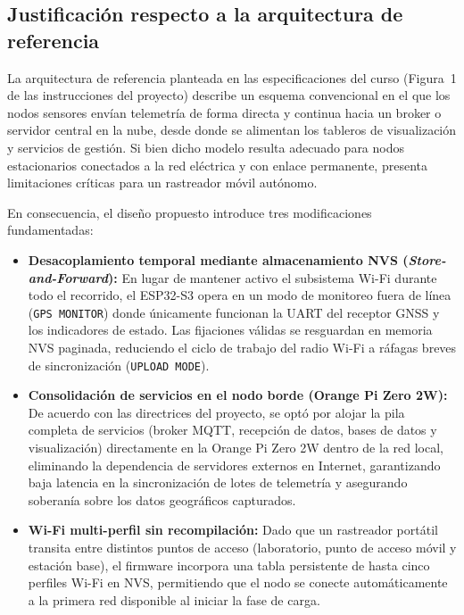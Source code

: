 \documentclass[12pt, letterpaper]{article}
\begin{document}
\subsection*{Justificación respecto a la arquitectura de referencia}

La arquitectura de referencia planteada en las especificaciones del curso (Figura~1 de las instrucciones del proyecto) describe un esquema convencional en el que los nodos sensores envían telemetría de forma directa y continua hacia un broker o servidor central en la nube, desde donde se alimentan los tableros de visualización y servicios de gestión. Si bien dicho modelo resulta adecuado para nodos estacionarios conectados a la red eléctrica y con enlace permanente, presenta limitaciones críticas para un rastreador móvil autónomo.

En consecuencia, el diseño propuesto introduce tres modificaciones fundamentadas:

\begin{itemize}
    \item \textbf{Desacoplamiento temporal mediante almacenamiento NVS (\textit{Store-and-Forward}):} En lugar de mantener activo el subsistema Wi-Fi durante todo el recorrido, el ESP32-S3 opera en un modo de monitoreo fuera de línea (\texttt{GPS MONITOR}) donde únicamente funcionan la UART del receptor GNSS y los indicadores de estado. Las fijaciones válidas se resguardan en memoria NVS paginada, reduciendo el ciclo de trabajo del radio Wi-Fi a ráfagas breves de sincronización (\texttt{UPLOAD MODE}).
    \item \textbf{Consolidación de servicios en el nodo borde (Orange Pi Zero 2W):} De acuerdo con las directrices del proyecto, se optó por alojar la pila completa de servicios (broker MQTT, recepción de datos, bases de datos y visualización) directamente en la Orange Pi Zero 2W dentro de la red local, eliminando la dependencia de servidores externos en Internet, garantizando baja latencia en la sincronización de lotes de telemetría y asegurando soberanía sobre los datos geográficos capturados.
    \item \textbf{Wi-Fi multi-perfil sin recompilación:} Dado que un rastreador portátil transita entre distintos puntos de acceso (laboratorio, punto de acceso móvil y estación base), el firmware incorpora una tabla persistente de hasta cinco perfiles Wi-Fi en NVS, permitiendo que el nodo se conecte automáticamente a la primera red disponible al iniciar la fase de carga.
\end{itemize}
\end{document}
